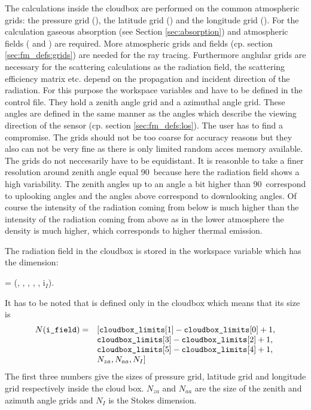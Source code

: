 \label{sec:scattering:grids}
The calculations inside the cloudbox are performed on the common 
atmospheric grids: the pressure grid
(), the latitude grid  ()
and the longitude grid ().
For the  calculation  gaseous absorption (see Section \ref{sec:absorption}) and atmospheric fields ( and ) are required. More atmospheric grids and fields (cp. section  \ref{sec:fm_defs:grids}) are needed for the ray tracing.
Furthermore anglular grids are necessary for the scattering calculations  
as the radiation field, the scattering efficiency matrix etc. depend
on the propagation and incident direction of the radiation. For this purpose  the workspace  
variables  and 
have to be defined in the control file. They hold a zenith angle grid and a azimuthal angle grid. These angles are defined in the same manner as the angles which describe the viewing direction of the sensor (cp. section \ref{sec:fm_defs:los}).
The user has to find a compromise. The grids should not be too coarse for accuracy reasons but they also can not be very fine as there is only limited random acces memory available.
The grids do not neccesarily have to be equidistant. It is reasonble to take a finer resolution around zenith angle equal 90\degree\ because here the radiation field shows a high variability. The zenith angles up to an angle a bit higher than 90\degree\ correspond to uplooking angles and the angles above correspond to downlooking angles. Of course the intensity of the radiation coming from below is much higher than the intensity of the radiation coming from above as in the lower atmosphere the density is much higher, which corresponds to higher thermal emission.\newline

\vspace{1ex}
The radiation field in the cloudbox is stored in the workspace variable 
  which has the dimension:
\begin{center}
  =  (\Prs, \Lat, \Lon, \ScaZa,
\ScaAa, i$_I$). 
\end{center}
It has to be noted that  is defined only in the cloudbox which means that its size is   
\[ \begin{array}{rl}
 N(\texttt{i\_field}) =& [\texttt{cloudbox\_limits}[1] - \texttt{cloudbox\_limits}[0] + 1,\\
              &\texttt{cloudbox\_limits}[3] -\texttt{cloudbox\_limits}[2] + 1, \\
              &\texttt{cloudbox\_limits}[5] -\texttt{cloudbox\_limits}[4] + 1,  \\
              & N_{za}, N_{aa}, N_{I} ] 
\end{array}\]
The first three numbers give the sizes of pressure grid, latitude grid
and longitude grid respectively inside the cloud box. $N_{za}$ and
$N_{aa}$ are the size of the zenith and azimuth angle grids and
$N_{I}$ is the Stokes dimension.  


